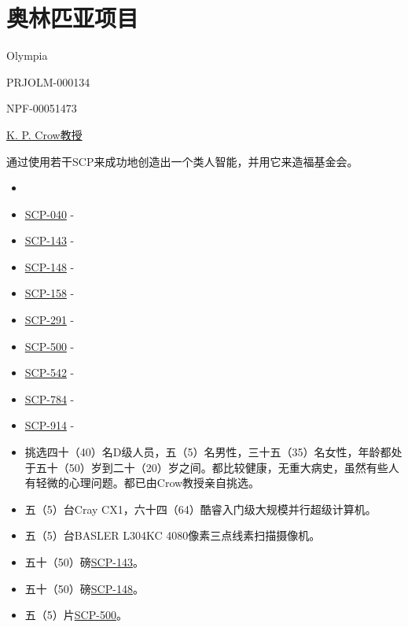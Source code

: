 \chapter{奥林匹亚项目}

\label{chap:COMP-olympia-project}

Olympia

PRJOLM-000134

NPF-00051473

\hyperref[chap:AUTHOR-kain-pathos-crow]{K. P. Crow教授}

通过使用若干SCP来成功地创造出一个类人智能，并用它来造福基金会。


\begin{itemize}
\item {}\bb{{[}此用途由于技术上的困难已废除]}
\item \hyperref[chap:SCP-040]{SCP-040} - 
\item \hyperref[chap:SCP-143]{SCP-143} - 
\item \hyperref[chap:SCP-148]{SCP-148} - 
\item \hyperref[chap:SCP-158]{SCP-158} - 
\item \hyperref[chap:SCP-291]{SCP-291} - 
\item \hyperref[chap:SCP-500]{SCP-500} - 
\item \hyperref[chap:SCP-542]{SCP-542} - 
\item \hyperref[chap:SCP-784]{SCP-784} - 
\item \hyperref[chap:SCP-914]{SCP-914} - 
\end{itemize}


\begin{itemize}
\item 挑选四十（40）名D级人员，五（5）名男性，三十五（35）名女性，年龄都处于五十（50）岁到二十（20）岁之间。都比较健康，无重大病史，虽然有些人有轻微的心理问题。都已由Crow教授亲自挑选。
\item 五（5）台Cray CX1，六十四（64）酷睿入门级大规模并行超级计算机。
\item 五（5）台BASLER L304KC 4080像素三点线素扫描摄像机。
\item 五十（50）磅\hyperref[chap:SCP-143]{SCP-143}。
\item 五十（50）磅\hyperref[chap:SCP-148]{SCP-148}。
\item 五（5）片\hyperref[chap:SCP-500]{SCP-500}。
\end{itemize}

